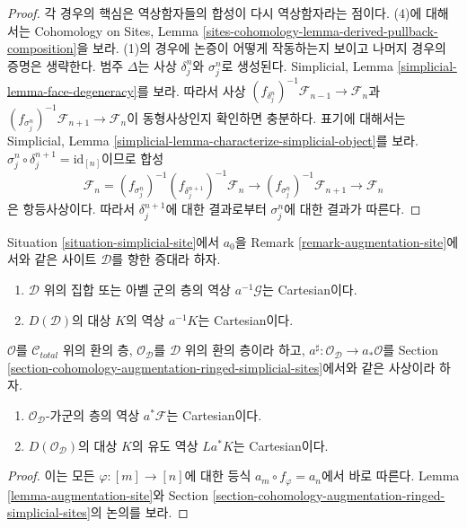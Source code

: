 \begin{proof}
각 경우의 핵심은 역상함자들의 합성이 다시 역상함자라는 점이다.
(4)에 대해서는 Cohomology on Sites, Lemma
\ref{sites-cohomology-lemma-derived-pullback-composition}을 보라.
(1)의 경우에 논증이 어떻게 작동하는지 보이고 나머지 경우의 증명은 생략한다.
범주 $\Delta$는 사상 $\delta^n_j$와 $\sigma^n_j$로 생성된다.
Simplicial, Lemma \ref{simplicial-lemma-face-degeneracy}를 보라.
따라서 사상
$(f_{\delta^n_j})^{-1}\mathcal{F}_{n - 1} \to \mathcal{F}_n$과
$(f_{\sigma^n_j})^{-1}\mathcal{F}_{n + 1} \to \mathcal{F}_n$이
동형사상인지 확인하면 충분하다. 표기에 대해서는
Simplicial, Lemma \ref{simplicial-lemma-characterize-simplicial-object}를 보라.
$\sigma^n_j \circ \delta_j^{n + 1} = \text{id}_{[n]}$이므로 합성
$$
\mathcal{F}_n =
(f_{\sigma^n_j})^{-1}
(f_{\delta_j^{n + 1}})^{-1}
\mathcal{F}_n \to
(f_{\sigma^n_j})^{-1}
\mathcal{F}_{n + 1} \to
\mathcal{F}_n
$$
은 항등사상이다. 따라서 $\delta^{n + 1}_j$에 대한 결과로부터
$\sigma^n_j$에 대한 결과가 따른다.
\end{proof}

\begin{lemma}
\label{lemma-augmentation-cartesian-module}
Situation \ref{situation-simplicial-site}에서
$a_0$을 Remark \ref{remark-augmentation-site}에서와 같은
사이트 $\mathcal{D}$를 향한 증대라 하자.
\begin{enumerate}
\item $\mathcal{D}$ 위의 집합 또는 아벨 군의 층의 역상
$a^{-1}\mathcal{G}$는 Cartesian이다.
\item $D(\mathcal{D})$의 대상 $K$의 역상 $a^{-1}K$는 Cartesian이다.
\end{enumerate}
$\mathcal{O}$를 $\mathcal{C}_{total}$ 위의 환의 층,
$\mathcal{O}_\mathcal{D}$를 $\mathcal{D}$ 위의 환의 층이라 하고,
$a^\sharp : \mathcal{O}_\mathcal{D} \to a_*\mathcal{O}$를
Section \ref{section-cohomology-augmentation-ringed-simplicial-sites}에서와
같은 사상이라 하자.
\begin{enumerate}
\item[(3)] $\mathcal{O}_\mathcal{D}$-가군의 층의 역상
$a^*\mathcal{F}$는 Cartesian이다.
\item[(4)] $D(\mathcal{O}_\mathcal{D})$의 대상
$K$의 유도 역상 $La^*K$는 Cartesian이다.
\end{enumerate}
\end{lemma}

\begin{proof}
이는 모든 $\varphi : [m] \to [n]$에 대한 등식
$a_m \circ f_\varphi = a_n$에서 바로 따른다.
Lemma \ref{lemma-augmentation-site}와
Section \ref{section-cohomology-augmentation-ringed-simplicial-sites}의
논의를 보라.
\end{proof}

